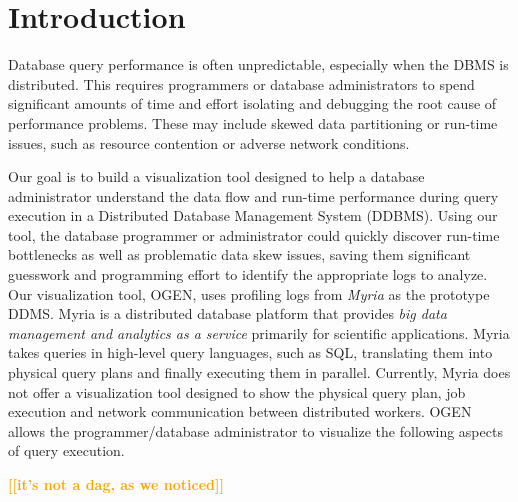 \documentclass{chi2009}
\newcommand*{\system}{OGEN\xspace}
\newcommand{\todo}[1]{\textsf{\textbf{\textcolor{Orange}{[[#1]]}}}}
\begin{document}
\section{Introduction}

Database query performance is often unpredictable, especially when the DBMS is
distributed. This requires programmers or database administrators to spend
significant amounts of time and effort isolating and debugging the root cause
of performance problems. These may include skewed data partitioning or run-time
issues, such as resource contention or adverse network conditions.

Our goal is to build a visualization tool designed to help a database administrator understand the data flow and run-time
performance during query execution in a Distributed Database Management System (DDBMS). Using our tool, the
database programmer or administrator could quickly discover run-time bottlenecks as well as problematic data skew issues,
saving them significant guesswork and programming effort to identify the appropriate logs to analyze. Our visualization tool,
\system, uses profiling logs from \emph{Myria} \cite{myria} as the prototype DDMS. Myria is a distributed
database platform that provides \emph{big data management and analytics as a service} primarily for scientific applications.
Myria takes queries in high-level query languages, such as SQL, translating them into physical query plans and finally executing
them in parallel. Currently, Myria does not offer a visualization tool designed to show the physical query plan, job execution and network
communication between distributed workers. \system allows the programmer/database administrator to visualize the following aspects
of query execution.

\todo{it's not a dag, as we noticed}
\end{document}
